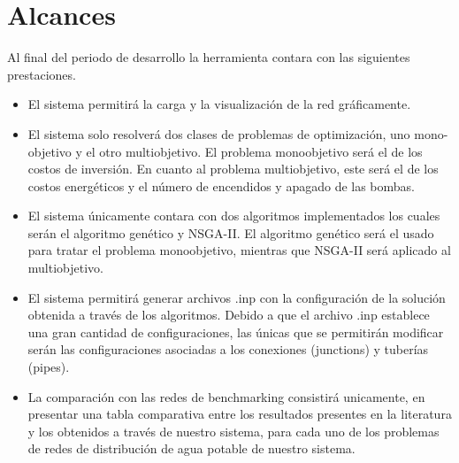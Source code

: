 \documentclass[11pt,letterpaper]{article}
\begin{document}
\section{Alcances}
Al final del periodo de desarrollo la herramienta contara con las siguientes prestaciones.
\begin{itemize}

\item El sistema permitirá la carga y la visualización de la red gráficamente.
\item El sistema solo resolverá dos clases de problemas de optimización, uno mono-objetivo y el otro multiobjetivo. El problema monoobjetivo será el de los costos de inversión. En cuanto al problema multiobjetivo, este será el de los costos energéticos y el número de encendidos y apagado de las bombas.  
\item El sistema únicamente contara con dos algoritmos implementados los cuales serán el algoritmo genético y NSGA-II. El algoritmo genético será el usado para tratar el problema monoobjetivo, mientras que NSGA-II será aplicado al multiobjetivo.
\item El sistema permitirá generar archivos .inp con la configuración de la solución obtenida a través de los algoritmos. Debido a que el archivo .inp establece una gran cantidad de configuraciones, las únicas que se permitirán modificar serán las configuraciones asociadas a los conexiones (junctions) y tuberías (pipes).
\item La comparación con las redes de benchmarking consistirá unicamente, en presentar una tabla comparativa entre los resultados presentes en la literatura y los obtenidos a través de nuestro sistema, para cada uno de los problemas de redes de distribución de agua potable de nuestro sistema.

\end{itemize}
\end{document}
